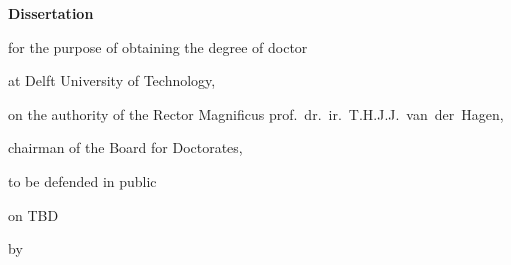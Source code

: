 \begin{titlepage}

\begin{center}

\vspace*{2\bigskipamount}

{\makeatletter
\titlestyle\bfseries\LARGE\@title
\makeatother}

{\makeatletter
\ifx\@subtitle\undefined\else
    \bigskip
    \titlefont\titleshape\Large\@subtitle
\fi
\makeatother}

\end{center}

\cleardoublepage
\thispagestyle{empty}

\begin{center}


\vspace*{2\bigskipamount}

{\makeatletter
\titlestyle\bfseries\LARGE\@title
\makeatother}

{\makeatletter
\ifx\@subtitle\undefined\else
    \bigskip
    \titlefont\titleshape\Large\@subtitle
\fi
\makeatother}

\vfill


{\Large\titlefont\bfseries Dissertation}

\bigskip
\bigskip

for the purpose of obtaining the degree of doctor

at Delft University of Technology,

on the authority of the Rector Magnificus prof.~dr.~ir.~T.H.J.J.~van~der~Hagen,

chairman of the Board for Doctorates,

to be defended in public

on TBD

\bigskip
\bigskip

by

\bigskip
\bigskip

\makeatletter
{\Large\titlefont\bfseries\@firstname\ \titleshape{\MakeUppercase{\@lastname}}}
\makeatother


\end{center}
\end{titlepage}

